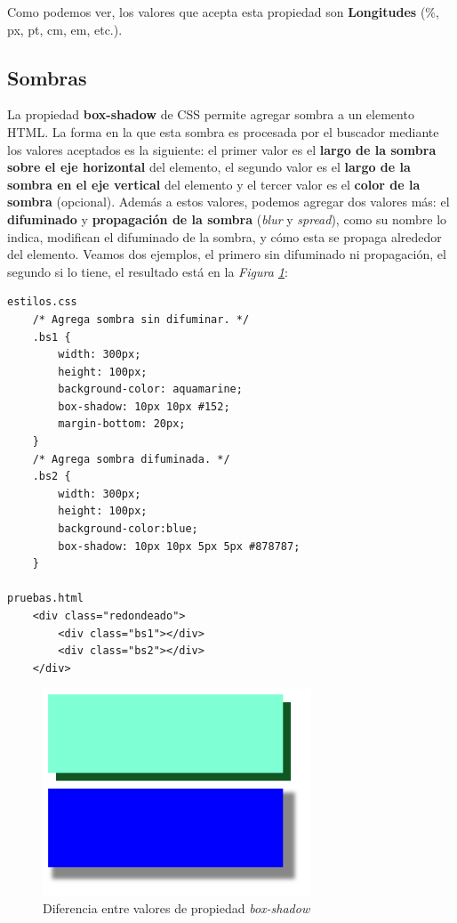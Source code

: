 Como podemos ver, los valores que acepta esta propiedad son \textbf{Longitudes} (\%, px, pt, cm, em, etc.).


\subsection{Sombras}

La propiedad \textbf{box-shadow} de CSS permite agregar sombra a un elemento HTML. La forma en la que esta sombra es procesada por el buscador mediante los valores aceptados es la siguiente: el primer valor es el \textbf{largo de la sombra sobre el eje horizontal} del elemento, el segundo valor es el \textbf{largo de la sombra en el eje vertical} del elemento y el tercer valor es el \textbf{color de la sombra} (opcional). Además a estos valores, podemos agregar dos valores más: el \textbf{difuminado} y \textbf{propagación de la sombra} (\textit{blur} y \textit{spread}), como su nombre lo indica, modifican el difuminado de la sombra, y cómo esta se propaga alrededor del elemento. Veamos dos ejemplos, el primero sin difuminado ni propagación, el segundo si lo tiene, el resultado está en la \textit{Figura \ref{fig: 34}}:
\begin{lstlisting}
estilos.css
    /* Agrega sombra sin difuminar. */
    .bs1 {
        width: 300px;
        height: 100px;
        background-color: aquamarine;
        box-shadow: 10px 10px #152;
        margin-bottom: 20px;
    }
    /* Agrega sombra difuminada. */
    .bs2 {
        width: 300px;
        height: 100px;
        background-color:blue;
        box-shadow: 10px 10px 5px 5px #878787;
    }

pruebas.html
    <div class="redondeado">
        <div class="bs1"></div>
        <div class="bs2"></div>
    </div>
\end{lstlisting}
\begin{figure}[H]
    \centering
    \caption{Diferencia entre valores de propiedad \textit{box-shadow}}
    \label{fig: 34}
    \includegraphics[width=8cm]{ss/box-shadow1.png}
\end{figure}

